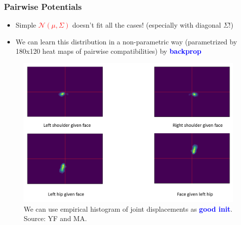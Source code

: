 \documentclass{beamer}
\newcommand\red[1]{\textcolor{red}{\textbf{#1}}}
\newcommand\blue[1]{\textcolor{blue}{\textbf{#1}}}
\begin{document}
    
    \begin{frame}[t]
    	\frametitle{Pairwise Potentials}
    	\begin{itemize}
    		\item Simple \red{$\mathcal{N}(\mu, \Sigma)$} doesn’t fit all the cases! (especially with diagonal $\Sigma$!) \\
    		\item We can learn this distribution in a non-parametric way (parametrized by 180x120 heat maps of pairwise compatibilities) by \blue{backprop}
    	\end{itemize}
    	\begin{center}
    		\begin{figure}[htbp] %
    			\includegraphics[scale=0.28]{pairwise_po.png} \\
    			\scriptsize We can use empirical histogram of joint displacements as \blue{good init}. Source: YF and MA.
    		\end{figure}
    	\end{center}
    \end{frame}
    
\end{document}
